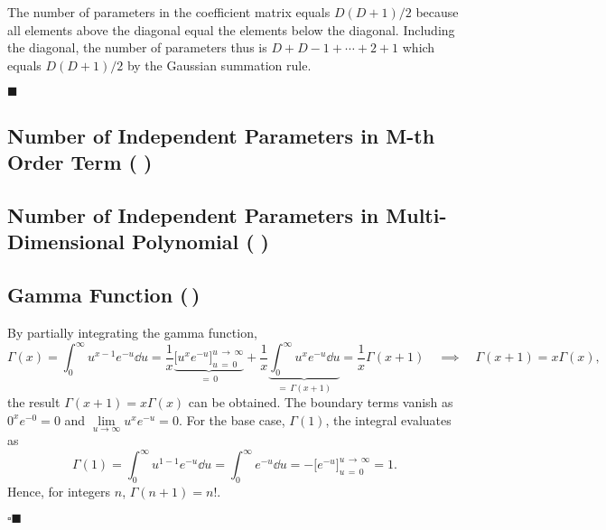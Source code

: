 \documentclass[11pt, a4paper]{scrartcl}
\newcommand{\eot}{\hfill\(\blacksquare\)}
\newcommand{\qedeot}{\hfill\(\square\blacksquare\)}
\newcommand{\diffstar}{\texorpdfstring{\raisebox{-1pt}{\resizebox{!}{8pt}{\(\star\)}}}{*}}
\newcommand{\twostar}  {(\diffstar\,\diffstar)}
\newcommand{\threestar}{(\diffstar\,\diffstar\,\diffstar)}
\begin{document}
			The number of parameters in the coefficient matrix equals \( D (D + 1) / 2 \) because all elements above the diagonal equal the elements below the diagonal. Including the diagonal, the number of parameters thus is \( D + D - 1 + \cdots + 2 + 1 \) which equals \( D (D + 1) / 2 \) by the Gaussian summation rule.

			\eot

		\subsection{Number of Independent Parameters in M-th Order Term  \threestar}

		\subsection{Number of Independent Parameters in Multi-Dimensional Polynomial  \threestar}

		\subsection{Gamma Function  \twostar}
			By partially integrating the gamma function,
			\begin{equation}
				\Gamma(x)
					= \int_0^\infty\! u^{x - 1} e^{-u} \dd{u}
					= \frac{1}{x} \underbrace{\big[ u^x e^{-u} \big]_{u \,=\, 0}^{u \,\to\, \infty}}_{=\, 0} + \frac{1}{x} \underbrace{\int_0^\infty\! u^x e^{-u} \dd{u}}_{=\, \Gamma(x + 1)}
					= \frac{1}{x} \Gamma(x + 1)
				\quad\implies\quad
				\Gamma(x + 1) = x \Gamma(x),
			\end{equation}
			the result \( \Gamma(x + 1) = x \Gamma(x) \) can be obtained. The boundary terms vanish as \( 0^x e^{-0} = 0 \) and \( \lim\limits_{u \to \infty} u^x e^{-u} = 0 \). For the base case, \( \Gamma(1) \), the integral evaluates as
			\begin{equation}
				\Gamma(1)
					= \int_0^\infty\! u^{1 - 1} e^{-u} \dd{u}
					= \int_0^\infty\! e^{-u} \dd{u}
					= -\big[ e^{-u} \big]_{u \,=\, 0}^{u \,\to\, \infty}
					= 1.
			\end{equation}
			Hence, for integers \(n\), \( \Gamma(n + 1) = n! \).

			\qedeot
\end{document}
